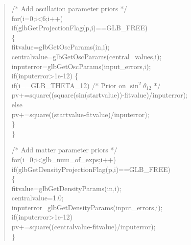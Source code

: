 {\begin{quote}
{{ \hspace*{0.5cm} /* Add oscillation parameter priors */ \\
  \hspace*{0.5cm}  for(i=0;i<6;i++) \\
  \hspace*{0.5cm} if(glbGetProjectionFlag(p,i)==GLB\_FREE) \\
  \hspace*{0.5cm} \{ \\
  \hspace*{1cm} fitvalue=glbGetOscParams(in,i); \\
  \hspace*{1cm} centralvalue=glbGetOscParams(central\_values,i); \\
  \hspace*{1cm} inputerror=glbGetOscParams(input\_errors,i); \\
  \hspace*{1cm} if(inputerror>1e-12) 
  \hspace*{1cm} \{ \\
  \hspace*{1.5cm} if(i==GLB\_THETA\_12) /* Prior on $\sin^2 \theta_{12}$ */ \\ 
\hspace*{2.0cm} pv+=square((square(sin(startvalue))-fitvalue)/inputerror);\\ 
  \hspace*{1.5cm} else \\ 
  \hspace*{2.0cm}  pv+=square((startvalue-fitvalue)/inputerror); \\
  \hspace*{1cm} \} \\
  \hspace*{0.5cm} \} 

\hspace*{0.5cm} /* Add matter parameter priors */ \\
  \hspace*{0.5cm} for(i=0;i<glb\_num\_of\_exps;i++) \\
  \hspace*{0.5cm} if(glbGetDensityProjectionFlag(p,i)==GLB\_FREE) \\
  \hspace*{0.5cm} \{ \\
  \hspace*{1cm}  fitvalue=glbGetDensityParams(in,i); \\
  \hspace*{1cm}  centralvalue=1.0; \\
  \hspace*{1cm}  inputerror=glbGetDensityParams(input\_errors,i); \\
  \hspace*{1cm}  if(inputerror>1e-12) \\
  \hspace*{1.5cm}   pv+=square((centralvalue-fitvalue)/inputerror); \\
  \hspace*{0.5cm} \} 

}}
\end{quote}}
